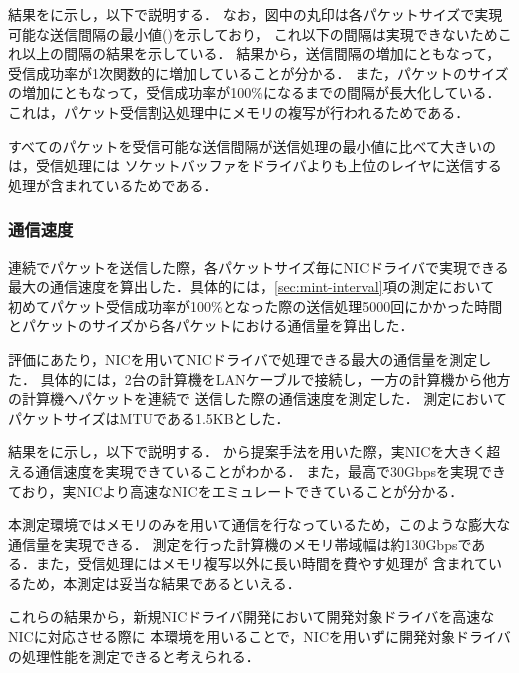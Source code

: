 \documentclass[submit,techreq,noauthor,dvipdfmx]{ipsj}
\begin{document}
結果をに示し，以下で説明する．
なお，図中の丸印は各パケットサイズで実現可能な送信間隔の最小値()を示しており，
これ以下の間隔は実現できないためこれ以上の間隔の結果を示している．
結果から，送信間隔の増加にともなって，受信成功率が1次関数的に増加していることが分かる．
また，パケットのサイズの増加にともなって，受信成功率が100\%になるまでの間隔が長大化している．
これは，パケット受信割込処理中にメモリの複写が行われるためである．

すべてのパケットを受信可能な送信間隔が送信処理の最小値に比べて大きいのは，受信処理には
ソケットバッファをドライバよりも上位のレイヤに送信する処理が含まれているためである．

\subsubsection{通信速度}\label{sec:interval}

連続でパケットを送信した際，各パケットサイズ毎にNICドライバで実現できる
最大の通信速度を算出した．具体的には，\ref{sec:mint-interval}項の測定において
初めてパケット受信成功率が100\%となった際の送信処理5000回にかかった時間とパケットのサイズから各パケットにおける通信量を算出した．

評価にあたり，NICを用いてNICドライバで処理できる最大の通信量を測定した．
具体的には，2台の計算機をLANケーブルで接続し，一方の計算機から他方の計算機へパケットを連続で
送信した際の通信速度を測定した．
測定においてパケットサイズはMTUである1.5KBとした．

結果をに示し，以下で説明する．
から提案手法を用いた際，実NICを大きく超える通信速度を実現できていることがわかる．
また，最高で30Gbpsを実現できており，実NICより高速なNICをエミュレートできていることが分かる．

本測定環境ではメモリのみを用いて通信を行なっているため，このような膨大な通信量を実現できる．
測定を行った計算機のメモリ帯域幅は約130Gbpsである．また，受信処理にはメモリ複写以外に長い時間を費やす処理が
含まれているため，本測定は妥当な結果であるといえる．

これらの結果から，新規NICドライバ開発において開発対象ドライバを高速なNICに対応させる際に
本環境を用いることで，NICを用いずに開発対象ドライバの処理性能を測定できると考えられる．
\end{document}
